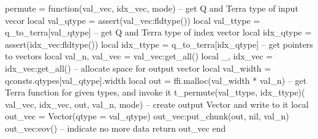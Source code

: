 permute = function(val_vec, idx_vec, mode)
  -- get Q and Terra type of input vecor
  local val_qtype = assert(val_vec:fldtype())
  local val_ttype = q_to_terra[val_qtype]  
  -- get Q and Terra type of index vector
  local idx_qtype = assert(idx_vec:fldtype())
  local idx_ttype = q_to_terra[idx_qtype]  
  -- get pointers to vectors
  local val_n, val_vec = val_vec:get_all()
  local     _, idx_vec = idx_vec:get_all()
  -- allocate space for output vector
  local val_width = qconsts.qtypes[val_qtype].width
  local out = ffi.malloc(val_width * val_n)
  -- get Terra function for given types, and invoke it
  t_permute(val_ttype, idx_ttype)(
    val_vec, idx_vec, out, val_n, mode)
  -- create output Vector and write to it
  local out_vec = Vector({qtype = val_qtype})
  out_vec:put_chunk(out, nil, val_n) 
  out_vec:eov() -- indicate no more data
  return out_vec
end
